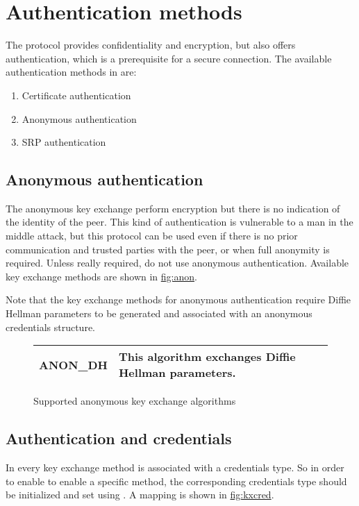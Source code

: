 \chapter{Authentication methods}

The \tls{} protocol provides confidentiality and encryption, but
also offers authentication, which is a prerequisite
for a secure connection. 
The available authentication methods in \gnutls{} are:
\begin{enumerate}
 \item Certificate authentication
 \item Anonymous authentication
 \item SRP authentication
\end{enumerate}



\section{Anonymous authentication}
The anonymous key exchange perform encryption but there is no indication of 
the identity of the peer. This kind of authentication is vulnerable to a
man in the middle attack, 
but this protocol can be used even if there is no prior communication and
trusted parties with the peer, or when full anonymity is required.
Unless really required, do not use anonymous authentication.
Available key exchange methods are shown in \hyperref{figure}{figure }{}{fig:anon}.
\par
Note that the key exchange methods for anonymous authentication
require Diffie Hellman parameters to be generated and associated with an
anonymous credentials structure. 

\begin{figure}[hbtp]
\begin{tabular}{|l|p{9cm}|}

\hline
ANON\_DH & This algorithm exchanges Diffie Hellman parameters. 
\\
\hline
\end{tabular}

\caption{Supported anonymous key exchange algorithms}
\label{fig:anon}

\end{figure}



\section{Authentication and credentials}
In \gnutls{} every key exchange method is associated with a
credentials type. So in order to enable to enable a specific
method, the corresponding credentials type should be initialized
and set using .
A mapping is shown in \hyperref{figure}{figure }{}{fig:kxcred}.

